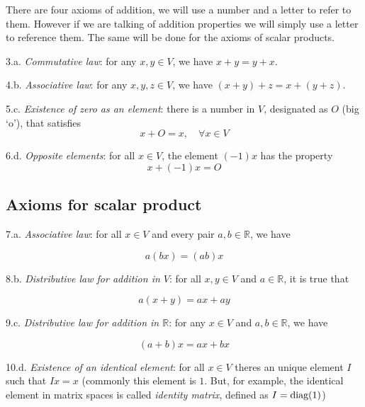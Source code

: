\documentclass{book}
\begin{document}
There are four axioms of addition, we will use a number and a letter to refer
to them. However if we are talking of addition properties we will simply use a
letter to reference them. The same will be done for the axioms of scalar
products.

\begin{list}{Axiom}{}
    \item 3.a.\textit{ Commutative law}: for any $x,y\in V$, we have $x+y = y+x$.
    \item 4.b.\textit{ Associative law}: for any $x,y,z\in V$, we have $(x+y) + z = x + (y + z)$.
    \item 5.c.\textit{ Existence of zero as an element}: there is a number in $V$, designated as $O$ (big `o'), that satisfies
          \[
              x + O = x,\quad \forall x \in V
          \]

    \item 6.d.\textit{ Opposite elements}: for all $x\in V$, the element $(-1)x$ has the property
          \[
              x + (-1)x = O
          \]
\end{list}

\subsection*{Axioms for scalar product}
\begin{list}{Axiom}{}

    \item 7.a.\textit{ Associative law}: for all $x \in V$ and every pair $a,b\in \mathbb R$, we have

          \[
              a(bx) = (ab)x
          \]

    \item 8.b.\textit{ Distributive law for addition in $V$}: for all $x,y\in V$ and $a\in \mathbb{R}$, it is true that

          \[
              a(x+y) = ax+ay
          \]

    \item 9.c.\textit{ Distributive law for addition in $\mathbb R$}: for any $x\in V$ and $a,b\in\mathbb{R}$, we have

          \[
              (a+b)x = ax+bx
          \]

    \item 10.d.\textit{ Existence of an identical element}: for all $x\in V$ theres an unique element $I$ such that $Ix=x$
          (commonly this element is $1$. But, for example, the identical element in matrix spaces is called \textit{identity matrix},
          defined as $I=\textnormal{diag}(1)$)
\end{list}
\end{document}
